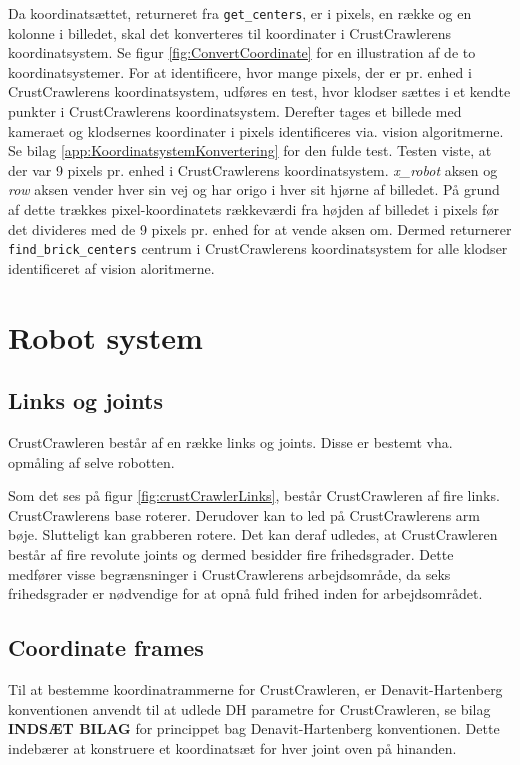 Da koordinatsættet, returneret fra \texttt{get\_centers}, er i pixels, en række og en kolonne i billedet, skal det konverteres til koordinater i CrustCrawlerens koordinatsystem.
Se figur \vref{fig:ConvertCoordinate} for en illustration af de to koordinatsystemer.
For at identificere, hvor mange pixels, der er pr. enhed i CrustCrawlerens koordinatsystem, udføres en test, hvor klodser sættes i et kendte punkter i CrustCrawlerens koordinatsystem.
Derefter tages et billede med kameraet og klodsernes koordinater i pixels identificeres via. vision algoritmerne.
Se bilag \vref{app:KoordinatsystemKonvertering} for den fulde test.
Testen viste, at der var 9 pixels pr. enhed i CrustCrawlerens koordinatsystem.
\textit{x\_robot} aksen og \textit{row} aksen vender hver sin vej og har origo i hver sit hjørne af billedet.
På grund af dette trækkes pixel-koordinatets rækkeværdi fra højden af billedet i pixels før det divideres med de 9 pixels pr. enhed for at vende aksen om.
Dermed returnerer \texttt{find\_brick\_centers} centrum i CrustCrawlerens koordinatsystem for alle klodser identificeret af vision aloritmerne.

\newpage
\section{Robot system}
\subsection{Links og joints}
CrustCrawleren består af en række links og joints. Disse er bestemt vha. opmåling af selve robotten. 


Som det ses på figur \ref{fig:crustCrawlerLinks}, består CrustCrawleren af fire links. CrustCrawlerens base roterer. Derudover kan to led på CrustCrawlerens arm bøje. Slutteligt kan grabberen rotere. Det kan deraf udledes, at CrustCrawleren består af fire revolute joints og dermed besidder fire frihedsgrader. Dette medfører visse begrænsninger i CrustCrawlerens arbejdsområde, da seks frihedsgrader er nødvendige for at opnå fuld frihed inden for arbejdsområdet.

\subsection{Coordinate frames}
Til at bestemme koordinatrammerne for CrustCrawleren, er Denavit-Hartenberg konventionen anvendt til at udlede DH parametre for CrustCrawleren, se bilag \textbf{INDSÆT BILAG} for princippet bag Denavit-Hartenberg konventionen. Dette indebærer at konstruere et koordinatsæt for hver joint oven på hinanden. 

